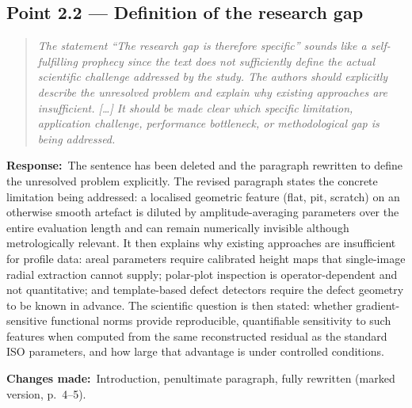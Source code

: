 \documentclass[11pt,a4paper]{article}
\newenvironment{reviewercomment}%
{\par\medskip\noindent\begin{quotation}\itshape\color{black!70}}%
{\end{quotation}\medskip}
\newcommand{\response}{\par\noindent\textbf{Response:}\ }
\newcommand{\changes}{\par\noindent\textbf{Changes made:}\ }
\begin{document}
\subsection*{Point 2.2 --- Definition of the research gap}
\begin{reviewercomment}
The statement ``The research gap is therefore specific'' sounds like a self-fulfilling prophecy since the text does not sufficiently define the actual scientific challenge addressed by the study. The authors should explicitly describe the unresolved problem and explain why existing approaches are insufficient. [\ldots] It should be made clear which specific limitation, application challenge, performance bottleneck, or methodological gap is being addressed.
\end{reviewercomment}
\response The sentence has been deleted and the paragraph rewritten to define the unresolved problem explicitly. The revised paragraph states the concrete limitation being addressed: a localised geometric feature (flat, pit, scratch) on an otherwise smooth artefact is diluted by amplitude-averaging parameters over the entire evaluation length and can remain numerically invisible although metrologically relevant. It then explains why existing approaches are insufficient for profile data: areal parameters require calibrated height maps that single-image radial extraction cannot supply; polar-plot inspection is operator-dependent and not quantitative; and template-based defect detectors require the defect geometry to be known in advance. The scientific question is then stated: whether gradient-sensitive functional norms provide reproducible, quantifiable sensitivity to such features when computed from the same reconstructed residual as the standard ISO parameters, and how large that advantage is under controlled conditions.
\changes Introduction, penultimate paragraph, fully rewritten (marked version, p.~4--5).
\end{document}
